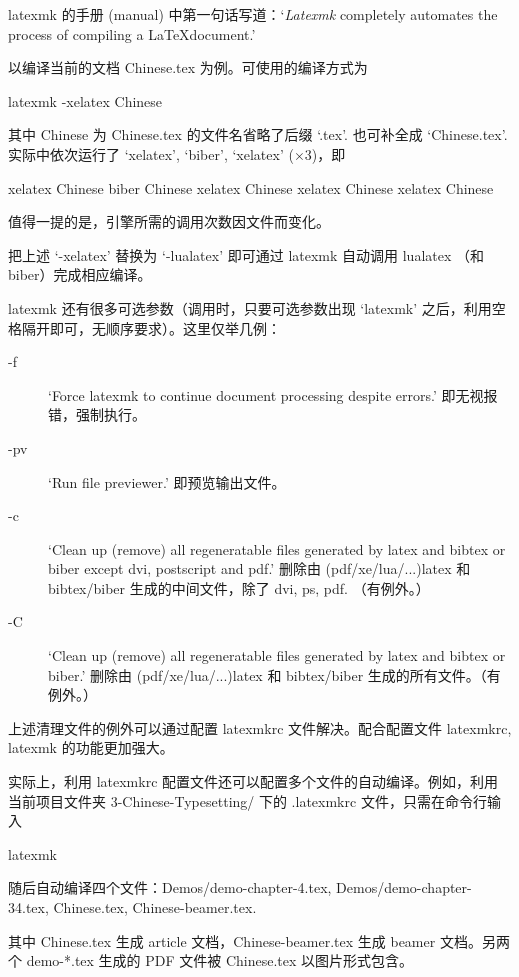 latexmk 的手册 (manual)\cite{latexmk} 中第一句话写道：`\emph{Latexmk} completely automates the process of compiling a \LaTeX document.'

以编译当前的文档 Chinese.tex 为例。可使用的编译方式为
\begin{bashlst}
latexmk -xelatex Chinese
\end{bashlst}
其中 Chinese 为 Chinese.tex 的文件名省略了后缀 `.tex'. 也可补全成 `Chinese.tex'. 实际中依次运行了 `xelatex', `biber', `xelatex' ($\times 3$)，即
\begin{bashlst}[numbers=left]
xelatex Chinese
biber Chinese
xelatex Chinese
xelatex Chinese
xelatex Chinese
\end{bashlst}
值得一提的是，引擎所需的调用次数因文件而变化。

把上述 `-xelatex' 替换为 `-lualatex' 即可通过 latexmk 自动调用 lualatex （和 biber）完成相应编译。

latexmk 还有很多可选参数（调用时，只要可选参数出现 `latexmk' 之后，利用空格隔开即可，无顺序要求）。这里仅举几例：
\begin{description}
\item[-f] `Force latexmk to continue document processing despite errors.' 即无视报错，强制执行。
\item[-pv] `Run file previewer.' 即预览输出文件。
\item[-c] `Clean up (remove) all regeneratable files generated by latex and bibtex or biber except dvi, postscript and pdf.' 删除由 (pdf/xe/lua/...)latex 和 bibtex/biber 生成的中间文件，除了 dvi, ps, pdf. （有例外。）
\item[-C] `Clean up (remove) all regeneratable files generated by latex and bibtex or biber.' 删除由 (pdf/xe/lua/...)latex 和 bibtex/biber 生成的所有文件。（有例外。）
\end{description}
上述清理文件的例外可以通过配置 latexmkrc 文件解决。配合配置文件 latexmkrc, latexmk 的功能更加强大。

实际上，利用 latexmkrc 配置文件还可以配置多个文件的自动编译。例如，利用当前项目文件夹 3-Chinese-Typesetting/ 下的 .latexmkrc 文件，只需在命令行输入
\begin{bashlst}
latexmk
\end{bashlst}
随后自动编译四个文件：Demos/demo-chapter-4.tex, Demos/demo-chapter-34.tex, Chinese.tex, Chinese-beamer.tex.

其中 Chinese.tex 生成 article 文档，Chinese-beamer.tex 生成 beamer 文档。另两个 demo-*.tex 生成的 PDF 文件被 Chinese.tex 以图片形式包含。


